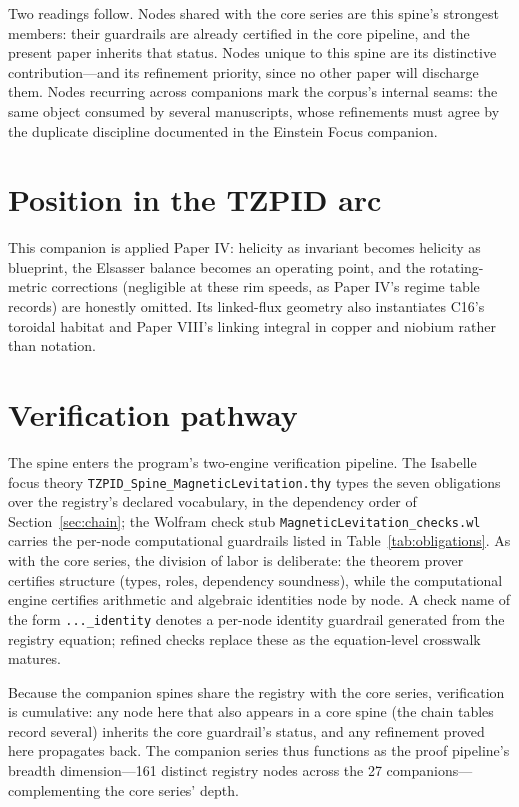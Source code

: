 \documentclass[11pt]{article}
\theoremstyle{remark}
\begin{document}
Two readings follow. Nodes shared with the core series are this spine's strongest members: their guardrails are already certified in the core pipeline, and the present paper inherits that status. Nodes unique to this spine are its distinctive contribution---and its refinement priority, since no other paper will discharge them. Nodes recurring across companions mark the corpus's internal seams: the same object consumed by several manuscripts, whose refinements must agree by the duplicate discipline documented in the Einstein Focus companion.

\section{Position in the TZPID arc}
\label{sec:arc}

This companion is applied Paper IV: helicity as invariant becomes helicity as blueprint, the Elsasser balance becomes an operating point, and the rotating-metric corrections (negligible at these rim speeds, as Paper IV's regime table records) are honestly omitted. Its linked-flux geometry also instantiates C16's toroidal habitat and Paper VIII's linking integral in copper and niobium rather than notation.

\section{Verification pathway}
\label{sec:verify}

The spine enters the program's two-engine verification pipeline. The Isabelle focus theory \texttt{TZPID\_Spine\_MagneticLevitation.thy} types the seven obligations over the registry's declared vocabulary, in the dependency order of Section~\ref{sec:chain}; the Wolfram check stub \texttt{MagneticLevitation\_checks.wl} carries the per-node computational guardrails listed in Table~\ref{tab:obligations}. As with the core series, the division of labor is deliberate: the theorem prover certifies structure (types, roles, dependency soundness), while the computational engine certifies arithmetic and algebraic identities node by node. A check name of the form \texttt{...\_identity} denotes a per-node identity guardrail generated from the registry equation; refined checks replace these as the equation-level crosswalk matures.

Because the companion spines share the registry with the core series, verification is cumulative: any node here that also appears in a core spine (the chain tables record several) inherits the core guardrail's status, and any refinement proved here propagates back. The companion series thus functions as the proof pipeline's breadth dimension---161 distinct registry nodes across the 27 companions---complementing the core series' depth.
\end{document}
